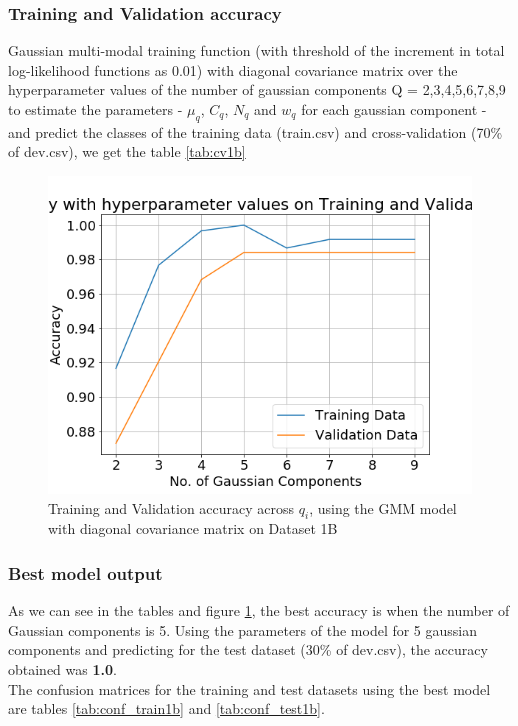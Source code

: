 \documentclass[11pt,a4paper]{article}
\begin{document}
\subsubsection{Training and Validation accuracy}
Gaussian multi-modal training function (with threshold of the increment in total log-likelihood functions as 0.01) with diagonal covariance matrix over the hyperparameter values of the number of gaussian components Q = {2,3,4,5,6,7,8,9} to estimate the parameters - $\mu_q$, $C_q$, $N_q$ and $w_q$ for each gaussian component - and predict the classes of the training data (train.csv) and cross-validation (70\% of dev.csv), we get the table \ref{tab:cv1b}

\begin{figure}[H]
    \centering
    \includegraphics[scale=0.5]{images/acc_1b.png}
    \caption{Training and Validation accuracy across $q_i$, using the GMM model with diagonal covariance matrix on Dataset 1B}
    \label{fig:acc1bGMMdiag}
\end{figure}

\subsubsection{Best model output}
As we can see in the tables and figure \ref{fig:acc1bGMMdiag}, the best accuracy is when the number of Gaussian components is 5. Using the parameters of the model for 5 gaussian components and predicting for the test dataset (30\% of dev.csv), the accuracy obtained was \textbf{1.0}.\\
The confusion matrices for the training and test datasets using the best model are tables \ref{tab:conf_train1b} and \ref{tab:conf_test1b}.\\


\end{document}
